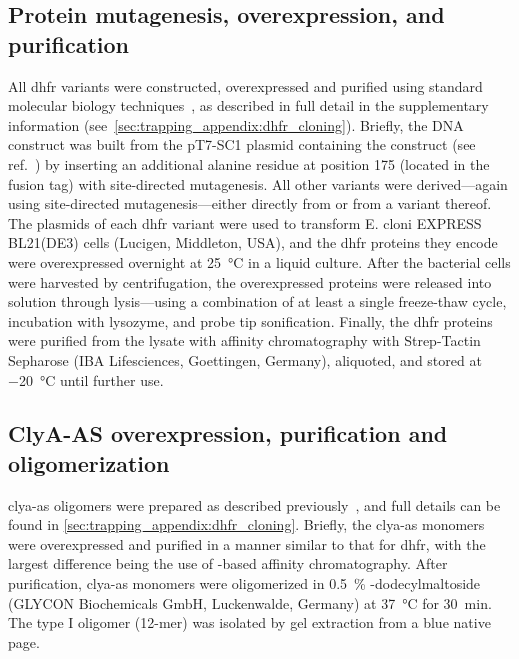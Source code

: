 \subsection{Protein mutagenesis, overexpression, and purification}
%

All \gls{dhfr} variants were constructed, overexpressed and purified using standard molecular biology
techniques~\cite{Soskine-Biesemans-2015,Biesemans-2015}, as described in full detail in the supplementary
information (see~\cref{sec:trapping_appendix:dhfr_cloning}). Briefly, the  DNA construct was built
from the {pT7-SC1} plasmid containing the \DHFRt{} construct (see ref.~\cite{Soskine-Biesemans-2015}) by
inserting an additional alanine residue at position 175 (located in the fusion tag) with site-directed
mutagenesis. All other variants were derived---again using site-directed mutagenesis---either directly from
 or from a variant thereof. The plasmids of each \gls{dhfr} variant were used to transform E.
cloni\textsuperscript{\textregistered} EXPRESS BL21(DE3) cells (Lucigen, Middleton, USA), and the \gls{dhfr}
proteins they encode were overexpressed overnight at \SI{25}{\celsius} in a liquid culture. After the
bacterial cells were harvested by centrifugation, the overexpressed proteins were released into solution
through lysis---using a combination of at least a single freeze-thaw cycle, incubation with lysozyme, and
probe tip sonification. Finally, the \gls{dhfr} proteins were purified from the lysate with affinity
chromatography with Strep-Tactin\textsuperscript{\textregistered} Sepharose\textsuperscript{\textregistered}
(IBA Lifesciences, Goettingen, Germany), aliquoted, and stored at \SI{-20}{\celsius} until further use.


\subsection{ClyA-AS overexpression, purification and oligomerization}
%

\gls{clya-as} oligomers were prepared as described previously~\cite{Soskine-2013}, and full details can be
found in \cref{sec:trapping_appendix:dhfr_cloning}. Briefly, the \gls{clya-as} monomers were overexpressed and
purified in a manner similar to that for \gls{dhfr}, with the largest difference being the use of
-based affinity chromatography. After purification, \gls{clya-as} monomers were oligomerized in
\SI{0.5}{\percent} \textbeta-dodecylmaltoside (GLYCON Biochemicals GmbH, Luckenwalde, Germany) at
\SI{37}{\celsius} for \SI{30}{\minute}. The type I oligomer (12-mer) was isolated by gel extraction from a
blue native \gls{page}.


